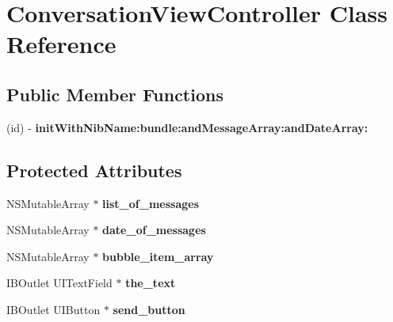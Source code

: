 \hypertarget{interface_conversation_view_controller}{
\section{\-Conversation\-View\-Controller \-Class \-Reference}
\label{interface_conversation_view_controller}
}
\subsection*{\-Public \-Member \-Functions}
\begin{DoxyCompactItemize}
\item 
\hypertarget{interface_conversation_view_controller_a14c42522832d99a9b19fd90b703f41cf}{
(id) -\/ {\bfseries init\-With\-Nib\-Name\-:bundle\-:and\-Message\-Array\-:and\-Date\-Array\-:}}
\label{interface_conversation_view_controller_a14c42522832d99a9b19fd90b703f41cf}

\end{DoxyCompactItemize}
\subsection*{\-Protected \-Attributes}
\begin{DoxyCompactItemize}
\item 
\hypertarget{interface_conversation_view_controller_a1e5f5cd28779804a9073aabbb5177d11}{
\-N\-S\-Mutable\-Array $\ast$ {\bfseries list\-\_\-of\-\_\-messages}}
\label{interface_conversation_view_controller_a1e5f5cd28779804a9073aabbb5177d11}

\item 
\hypertarget{interface_conversation_view_controller_aa80670f3431f61c755ea3abe26f1a0b3}{
\-N\-S\-Mutable\-Array $\ast$ {\bfseries date\-\_\-of\-\_\-messages}}
\label{interface_conversation_view_controller_aa80670f3431f61c755ea3abe26f1a0b3}

\item 
\hypertarget{interface_conversation_view_controller_a01c923ac0a21fd9ee8478539ff31b1e6}{
\-N\-S\-Mutable\-Array $\ast$ {\bfseries bubble\-\_\-item\-\_\-array}}
\label{interface_conversation_view_controller_a01c923ac0a21fd9ee8478539ff31b1e6}

\item 
\hypertarget{interface_conversation_view_controller_a69199afdf341b25ac20c903c86a14087}{
\-I\-B\-Outlet \-U\-I\-Text\-Field $\ast$ {\bfseries the\-\_\-text}}
\label{interface_conversation_view_controller_a69199afdf341b25ac20c903c86a14087}

\item 
\hypertarget{interface_conversation_view_controller_a08dde681dd3318cf743e6bb7ac0393b1}{
\-I\-B\-Outlet \-U\-I\-Button $\ast$ {\bfseries send\-\_\-button}}
\label{interface_conversation_view_controller_a08dde681dd3318cf743e6bb7ac0393b1}

\end{DoxyCompactItemize}
